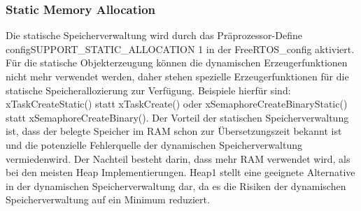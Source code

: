 \subsubsection{Static Memory Allocation}
Die statische Speicherverwaltung wird durch das Prä\-pro\-zes\-sor-Define configSUPPORT\_STATIC\_ALLOCATION 1 in der FreeRTOS\_config aktiviert. Für die statische Objekterzeugung können die dynamischen Erzeugerfunktionen nicht mehr verwendet werden, daher stehen spezielle Erzeugerfunktionen für die statische Speicherallozierung zur Verfügung. Beispiele hierfür sind: xTaskCreateStatic() statt xTaskCreate() oder xSemaphoreCreateBinaryStatic() statt xSemaphoreCreateBinary(). Der Vorteil der statischen Speicherverwaltung ist, dass der belegte Speicher im RAM schon zur Übersetzungszeit bekannt ist und die potenzielle Fehlerquelle der dynamischen Speicherverwaltung vermieden\newline wird. Der Nachteil besteht darin, dass mehr RAM verwendet wird, als bei den meisten Heap Implementierungen. Heap1 stellt eine geeignete Alternative in der dynamischen Speicherverwaltung dar, da es die Risiken der dynamischen Speicherverwaltung auf ein Minimum reduziert.   